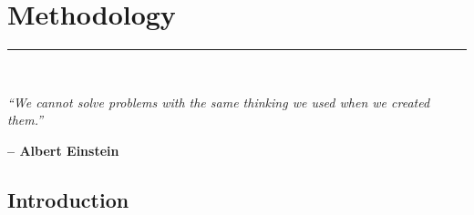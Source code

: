 \graphicspath{{content/chapters/4_methodology/figures/}}

\chapter{Methodology}%
\label{chp:methodology}
\rule{\textwidth}{1pt} \\[1ex]

\epigraph{\textit{``We cannot solve problems with the same thinking we used when we created them.''}}{\textbf{-- Albert Einstein}}

\section{Introduction}
\label{sec:4_introduction}

